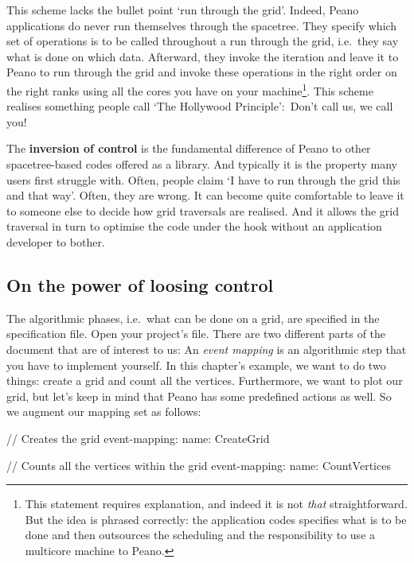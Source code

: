 This scheme lacks the bullet point `run through the grid'. 
Indeed, Peano applications do never run themselves through the spacetree.
They specify which set of operations is to be called throughout a run through
the grid, i.e.~they say what is done on which data.
Afterward, they invoke the iteration and leave it to Peano to run through the
grid and invoke these operations in the right order on the right ranks using all
the cores you have on your machine\footnote{This statement requires
explanation, and indeed it is not {\em that} straightforward. But the idea is
phrased correctly: the application codes specifies what is to be done and then
outsources the scheduling and the responsibility to use a multicore machine to
Peano.}.
This scheme realises something people call `The Hollywood Principle': Don't
call us, we call you!


\begin{remark}
  The {\bf inversion of control} is the fundamental difference of Peano to other
  spacetree-based codes offered as a library. 
  And typically it is the property many users first struggle with.
  Often, people claim `I have to run through the grid this and that way'. 
  Often, they are wrong.
  It can become quite comfortable to leave it to someone else to decide how 
  grid traversals are realised.
  And it allows the grid traversal in turn to optimise the code under the hook
  without an application developer to bother.
\end{remark}


\subsection{On the power of loosing control}

The algorithmic phases, i.e.~what can be done on a grid, are specified in the
specification file.
Open your project's file. 
There are two different parts of the document that are of interest to us:
An {\em event mapping} is an algorithmic step that you have to implement
yourself.
In this chapter's example, we want to do two things: create a grid and count all
the vertices. 
Furthermore, we want to plot our grid, but let's keep in mind that Peano has
some predefined actions as well.
So we augment our mapping set as follows:

\begin{code}
// Creates the grid
event-mapping:
  name: CreateGrid

// Counts all the vertices within the grid
event-mapping:
  name: CountVertices
\end{code}

